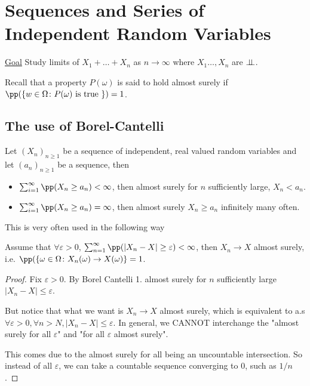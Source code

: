 \documentclass[../main.tex]{subfiles}
\begin{document}
\section{Sequences and Series of Independent Random
Variables}

\underline{\sffamily Goal} Study limits of $X_1 + \ldots + X_n$ as $n
\to \infty$ where $X_1 \ldots, X_n$ are $\perp\!\!\!\!\,\perp$. 

\vspace{0.5em}

\noindent Recall that a property $P(\omega)$ is said to hold almost surely if
$\pp(\{ w \in \Omega \colon P(\omega) \text{ is true }\}) = 1 $.

\subsection{The use of Borel-Cantelli}

Let $(X_n)_{n \geq1}$ be a sequence of independent, real valued random
variables and let $(a_n)_{n \geq 1}$ be a sequence, then

\begin{itemize}
  \item $\sum_{i = 1}^\infty \pp(X_n \geq a_n) < \infty$, then almost
    surely for $n$ sufficiently large, $X_n < a_n$.
  \item $\sum_{i = 1}^\infty \pp(X_n \geq a_n) = \infty$, then almost
    surely $X_n \geq a_n$ infinitely many often.
\end{itemize}

This is very often used in the following way
\begin{lemma}
  Assume that $\forall \varepsilon > 0 $, $\sum_{n =1}^\infty \pp(|X_n
  - X| \geq \varepsilon) < \infty$, then $X_n \to X$ almost surely,
  i.e.
  $\pp(\{ \omega \in \Omega \colon X_n(\omega) \to X(\omega) \} = 1 $.
\end{lemma}
\begin{proof}
    Fix $\varepsilon > 0 $. By Borel Cantelli 1. almost surely for $n$
    sufficiently large $|X_n - X| \leq \varepsilon$.

    \vspace{0.5em}
    \noindent But notice that what we want is $X_n \to X$ almost
    surely, which is equivalent to a.s $\forall \varepsilon > 0,
    \forall n > N, |X_n - X| \leq \varepsilon$. In general, we CANNOT
    interchange the "almost surely for all $\varepsilon$" and "for all
    $\varepsilon$ almost surely". 

    This comes due to the almost surely for all being an uncountable
    intersection. So instead of all $\varepsilon$, we can take a
    countable sequence converging to $0$, such as $1/n$.
\end{proof}
\end{document}
